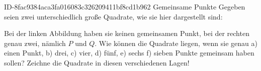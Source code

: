 \begin{exercise}
      {ID-8fac9384aca3fa016083c326209411bf8cd1b962}
      {Gemeinsame Punkte}
  \ifproblem\problem
    Gegeben seien zwei unterschiedlich große Quadrate, wie sie hier dargestellt
    sind:
    \begin{center}
    \end{center}
    Bei der linken Abbildung haben sie keinen gemeinsamen Punkt, bei der
    rechten genau zwei, nämlich $P$ und $Q$. Wie können die Quadrate liegen,
    wenn sie genau a) einen Punkt, b) drei, c) vier, d) fünf, e) sechs f) sieben
    Punkte gemeinsam haben sollen? Zeichne die Quadrate in diesen verschiedenen Lagen!
  \fi
\end{exercise}

%

